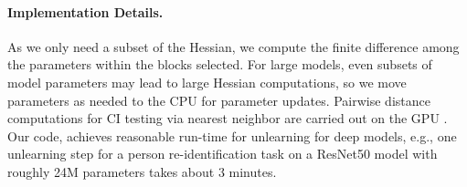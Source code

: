 \paragraph{Implementation Details.}
As we only need a subset of the Hessian, we compute the finite difference among the parameters within the blocks selected.
For large models, even subsets of model parameters may lead to large Hessian computations, so we move parameters as needed to the CPU for parameter updates. Pairwise distance computations for CI testing via nearest neighbor are carried out on the GPU \citep{yoso-zhanpeng}.
Our code, achieves reasonable run-time for unlearning for deep models, e.g., one unlearning step for a person re-identification task on a ResNet50 model with roughly 24M parameters takes about 3 minutes.  



